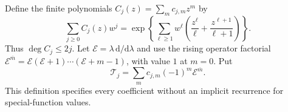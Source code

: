 Define the finite polynomials $C_j(z)=\sum_m c_{j,m}z^m$ by
\begin{equation}\label{herg:eq:C}
 \sum_{j\geq0}C_j(z)w^j
 =\exp\left\{\sum_{\ell\geq1}w^\ell
          \left(\frac{z^\ell}{\ell}
                       +\frac{z^{\ell+1}}{\ell+1}\right)\right\}.
\end{equation}
Thus $\deg C_j\leq2j$. Let $\mathcal E=\lambda\,\mathrm d/\mathrm d\lambda$
and use the rising operator factorial
$\mathcal E^{\overline m}=\mathcal E(\mathcal E+1)\cdots
(\mathcal E+m-1)$, with value $1$ at $m=0$. Put
\begin{equation}\label{herg:eq:T}
 \mathcal T_j=
   \sum_m c_{j,m}(-1)^m\mathcal E^{\overline m}.
\end{equation}
This definition specifies every coefficient without an implicit
recurrence for special-function values.


